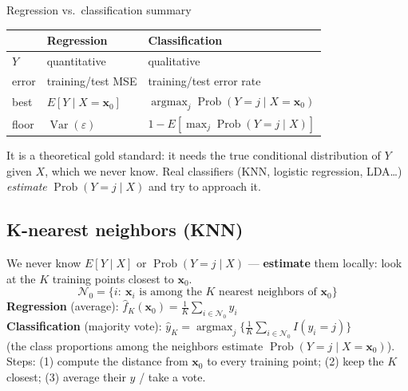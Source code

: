 \begin{topic}{Regression vs.\ classification summary }
\begin{tabular}{@{}lll@{}}
\toprule
 & Regression & Classification\\\midrule
$Y$ & quantitative & qualitative\\
error & training/test MSE & training/test error rate\\
best & $E[Y\mid X=\mathbf x_0]$ & $\operatorname{argmax}_j\operatorname{Prob}(Y=j\mid X=\mathbf x_0)$\\
floor & $\operatorname{Var}(\varepsilon)$ & $1-E[\max_j\operatorname{Prob}(Y=j\mid X)]$\\\bottomrule
\end{tabular}
\end{topic}

\begin{trap}
It is a theoretical gold standard: it needs the true conditional distribution of $Y$ given $X$, which we never know. Real classifiers (KNN, logistic regression, LDA\dots) \emph{estimate} $\operatorname{Prob}(Y=j\mid X)$ and try to approach it.
\end{trap}

\subsection{K-nearest neighbors (KNN)}

\begin{keybox}
We never know $E[Y\mid X]$ or $\operatorname{Prob}(Y=j\mid X)$ --- \textbf{estimate} them locally: look at the $K$ training points closest to $\mathbf x_0$.
\[ \mathcal N_0=\{i:\ \mathbf x_i \text{ is among the } K \text{ nearest neighbors of } \mathbf x_0\} \]
\textbf{Regression} (average): \quad $\displaystyle \hat f_K(\mathbf x_0)=\frac1K\sum_{i\in\mathcal N_0}y_i$\\
\textbf{Classification} (majority vote): \quad $\displaystyle \hat y_K=\operatorname{argmax}_j\Big\{\frac1K\sum_{i\in\mathcal N_0}I(y_i=j)\Big\}$\\
(the class proportions among the neighbors estimate $\operatorname{Prob}(Y=j\mid X=\mathbf x_0)$).
Steps: (1) compute the distance from $\mathbf x_0$ to every training point; (2) keep the $K$ closest; (3) average their $y$ / take a vote.
\end{keybox}

